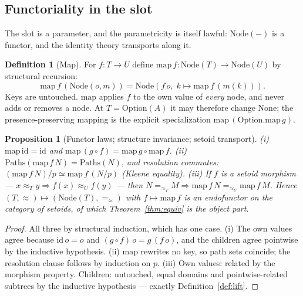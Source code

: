 \documentclass[11pt]{article}
\newtheorem{proposition}[theorem]{Proposition}
\theoremstyle{definition}
\newtheorem{definition}[theorem]{Definition}
\newcommand{\NodeT}[1]{\mathrm{Node}(#1)}
\newcommand{\eqS}{=_{\approx}}                     %
\newcommand{\Paths}{\mathrm{Paths}}
\begin{document}
\subsection{Functoriality in the slot}

The slot is a parameter, and the parametricity is itself lawful: $\NodeT{-}$ is a
functor, and the identity theory transports along it.

\begin{definition}[Map]\label{def:map}
For $f : T \to U$ define $\mathrm{map}\,f : \NodeT{T} \to \NodeT{U}$ by structural
recursion:
\[
\mathrm{map}\,f\,(\mathrm{Node}(o, m)) = \mathrm{Node}(f\,o,\; k \mapsto \mathrm{map}\,f\,(m(k))).
\]
Keys are untouched. $\mathrm{map}$ applies $f$ to the own value of \emph{every} node, and
never adds or removes a node. At $T = \mathrm{Option}(A)$ it may therefore change
$\mathrm{None}$; the presence-preserving mapping is the explicit specialization
$\mathrm{map}\,(\mathrm{Option}.\mathrm{map}\,g)$.
\end{definition}

\begin{proposition}[Functor laws; structure invariance; setoid transport]\label{prop:functor}
\emph{(i)} $\mathrm{map}\,\mathrm{id} = \mathrm{id}$ and
$\mathrm{map}\,(g \circ f) = \mathrm{map}\,g \circ \mathrm{map}\,f$.
\emph{(ii)} $\Paths(\mathrm{map}\,f\,N) = \Paths(N)$, and resolution commutes:
$(\mathrm{map}\,f\,N)/p \simeq \mathrm{map}\,f\,(N/p)$ (Kleene equality).
\emph{(iii)} If $f$ is a setoid morphism --- $x \approx_T y \Rightarrow
f(x) \approx_U f(y)$ --- then $N =_{\approx_T} M \Rightarrow
\mathrm{map}\,f\,N =_{\approx_U} \mathrm{map}\,f\,M$. Hence
$(T, \approx) \mapsto (\NodeT{T}, \eqS)$ with $f \mapsto \mathrm{map}\,f$ is an
endofunctor on the category of setoids, of which Theorem~\ref{thm:equiv} is the
object part.
\end{proposition}

\begin{proof}
All three by structural induction, which has one case. (i) The own values agree because
$\mathrm{id}\,o = o$ and $(g \circ f)\,o = g\,(f\,o)$, and the children agree pointwise
by the inductive hypothesis. (ii) $\mathrm{map}$ rewrites no key, so path sets coincide;
the resolution clause follows by induction on $p$.
(iii) Own values: related by the morphism property. Children: untouched, equal domains and pointwise-related subtrees by the
inductive hypothesis --- exactly Definition~\ref{def:lift}.
\end{proof}
\end{document}
